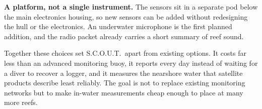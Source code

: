 \textbf{A platform, not a single instrument.} The sensors sit in a separate pod below the main electronics housing, so new sensors can be added without redesigning the hull or the electronics. An underwater microphone is the first planned addition, and the radio packet already carries a short summary of reef sound.

Together these choices set S.C.O.U.T.\ apart from existing options. It costs far less than an advanced monitoring buoy, it reports every day instead of waiting for a diver to recover a logger, and it measures the nearshore water that satellite products describe least reliably. The goal is not to replace existing monitoring networks but to make in-water measurements cheap enough to place at many more reefs.
